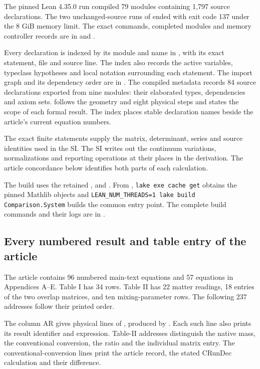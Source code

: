\documentclass[aps,prx,onecolumn,10pt,notitlepage,nofootinbib,longbibliography]{revtex4-2}
\numberwithin{equation}{section}
\numberwithin{table}{section}
\begin{document}
The pinned Lean 4.35.0 run compiled 79 modules containing 1,797 source
declarations. The two unchanged-source runs of
 ended with exit code 137 under
the 8 GiB memory limit. The exact commands, completed modules and memory
controller records are in  and
.

Every declaration is indexed by its module and name in
, with its exact statement, file and source line.
The index also records the active variables, typeclass hypotheses and
local notation surrounding each statement.
The import graph and its dependency order are in .
The compiled metadata records 84 source declarations exported from nine
modules: their elaborated types, dependencies and axiom sets. 
follows the geometry and eight physical steps and states the scope of each formal result.
The index places stable declaration names beside the article's current equation numbers.

The exact finite statements supply the matrix, determinant, series and
source identities used in the SI. The SI writes out the continuum
variations, normalizations and reporting operations at their places in
the derivation. The article concordance below identifies both parts of
each calculation.

The build uses the retained , 
and . From ,
\texttt{lake exe cache get} obtains the pinned Mathlib objects and
\texttt{LEAN\_NUM\_THREADS=1 lake build Comparison.System} builds the common entry point.
The complete build commands and their logs are in
.


\subsection{Every numbered result and table entry of the article}
\label{sec:articleconcordance}

The article contains 96 numbered main-text equations and 57 equations in
Appendices A--E. Table I has 34 rows. Table II has 22 matter readings,
18 entries of the two overlap matrices, and ten mixing-parameter rows.
The following 237 addresses follow their printed order.

The column AR gives physical lines of ,
produced by . Each such line also prints
its result identifier and expression. Table-II addresses distinguish the
native mass, the conventional conversion, the ratio and the individual
matrix entry. The conventional-conversion lines print the article record,
the stated CRunDec calculation and their difference.
\end{document}
